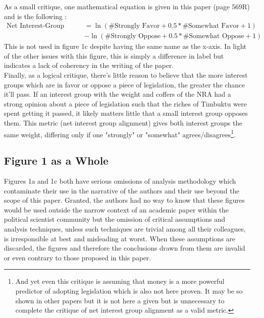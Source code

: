 \documentclass[]{article}
\begin{document}
As a small critique, one mathematical equation is given in this paper (page 569R) and is the following \cite{gilens}:
\begin{align*}
	\text{Net Interest-Group Alignment} &= \ln(\text{\# Strongly Favor} + 0.5* \text{\# Somewhat Favor} + 1) \\ &- \ln(\text{\# Strongly Oppose} + 0.5* \text{\# Somewhat Oppose} + 1)
\end{align*}
This is not used in figure 1c despite having the same name as the x-axis.
In light of the other issues with this figure, this is simply a difference in label but indicates a lack of coherency in the writing of the paper.\\

Finally, as a logical critique, there's little reason to believe that the more interest groups which are in favor or oppose a piece of legislation, the greater the chance it'll pass.
If an interest group with the weight and coffers of the NRA had a strong opinion about a piece of legislation such that the riches of Timbuktu were spent getting it passed, it likely matters little that a small interest group opposes them. 
This metric (net interest group alignment) gives both interest groups the same weight, differing only if one "strongly" or "somewhat" agrees/disagrees\footnote{And yet even this critique is assuming that money is a more powerful predictor of adopting legislation which is also not here proven. It may be so shown in other papers but it is not here a given but is unnecessary to complete the critique of net interest group alignment as a valid metric.}.

\subsection{Figure 1 as a Whole}
Figures 1a and 1c both have serious omissions of analysis methodology which contaminate their use in the narrative of the authors and their use beyond the scope of this paper.
Granted, the authors had no way to know that these figures would be used outside the narrow context of an academic paper within the political scientist community but the omission of critical assumptions and analysis techniques, unless such techniques are trivial among all their colleagues, is irresponsible at best and misleading at worst.
When these assumptions are discarded, the figures and therefore the conclusions drawn from them are invalid or even contrary to those proposed in this paper.\\
\end{document}
